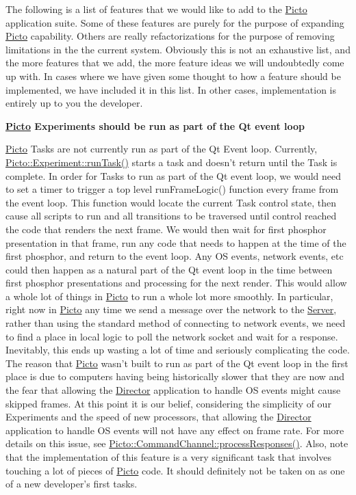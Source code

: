 The following is a list of features that we would like to add to the \hyperlink{namespace_picto}{Picto} application suite. Some of these features are purely for the purpose of expanding \hyperlink{namespace_picto}{Picto} capability. Others are really refactorizations for the purpose of removing limitations in the the current system. Obviously this is not an exhaustive list, and the more features that we add, the more feature ideas we will undoubtedly come up with. In cases where we have given some thought to how a feature should be implemented, we have included it in this list. In other cases, implementation is entirely up to you the developer.

{\bfseries \hyperlink{namespace_picto}{Picto} Experiments should be run as part of the Qt event loop}\par
 \hyperlink{namespace_picto}{Picto} Tasks are not currently run as part of the Qt Event loop. Currently, \hyperlink{class_picto_1_1_experiment_a6cfd77559307223a8121a6a016b489c2}{Picto\-::\-Experiment\-::run\-Task()} starts a task and doesn't return until the Task is complete. In order for Tasks to run as part of the Qt event loop, we would need to set a timer to trigger a top level run\-Frame\-Logic() function every frame from the event loop. This function would locate the current Task control state, then cause all scripts to run and all transitions to be traversed until control reached the code that renders the next frame. We would then wait for first phosphor presentation in that frame, run any code that needs to happen at the time of the first phosphor, and return to the event loop. Any O\-S events, network events, etc could then happen as a natural part of the Qt event loop in the time between first phosphor presentations and processing for the next render. This would allow a whole lot of things in \hyperlink{namespace_picto}{Picto} to run a whole lot more smoothly. In particular, right now in \hyperlink{namespace_picto}{Picto} any time we send a message over the network to the \hyperlink{class_server}{Server}, rather than using the standard method of connecting to network events, we need to find a place in local logic to poll the network socket and wait for a response. Inevitably, this ends up wasting a lot of time and seriously complicating the code. The reason that \hyperlink{namespace_picto}{Picto} wasn't built to run as part of the Qt event loop in the first place is due to computers having being historically slower that they are now and the fear that allowing the \hyperlink{class_director}{Director} application to handle O\-S events might cause skipped frames. At this point it is our belief, considering the simplicity of our Experiments and the speed of new processors, that allowing the \hyperlink{class_director}{Director} application to handle O\-S events will not have any effect on frame rate. For more details on this issue, see \hyperlink{class_picto_1_1_command_channel_aafe619791fb542563544ecf50628238b}{Picto\-::\-Command\-Channel\-::process\-Responses()}. Also, note that the implementation of this feature is a very significant task that involves touching a lot of pieces of \hyperlink{namespace_picto}{Picto} code. It should definitely not be taken on as one of a new developer's first tasks.

